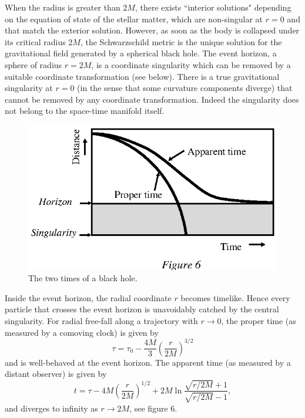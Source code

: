 \documentclass[12pt]{article}
\begin{document}
When the radius is greater than $2M$, there exists ``interior solutions"
depending on the equation of state of the stellar matter, which are
non-singular at $r=0$ and that match the exterior solution.  However,
as soon as the body is collapsed under its critical radius $2M$, the
Schwarzschild metric is the unique solution for the gravitational
field generated by a spherical black hole. The event horizon, a sphere of radius
$r=2M$, is a coordinate singularity which can be removed by a suitable
coordinate transformation (see below). There is a true gravitational
singularity at $r=0$ (in the sense that some curvature components diverge) that
cannot be removed by any coordinate transformation. Indeed the singularity does
not belong to the space-time manifold itself. 
\begin{figure}[tb]
  \begin{center}
    \leavevmode
    \includegraphics{time.ps}
    \caption{The two times of a black hole.}
  \end{center}
\end{figure}
Inside the event horizon, the radial coordinate $r$ becomes timelike. Hence
every particle that crosses the event horizon is unavoidably catched by the
central singularity. For radial free-fall along a trajectory with  $r
\rightarrow 0 $, the proper time (as measured by a comoving clock) is given by 
\begin{equation}
\tau =  \tau_0 - \frac{4M}{3}\left(\frac{r}{2M}\right)^{3/2}
\end{equation}
and is well-behaved at the event horizon.
 The apparent time (as measured by a distant observer) is given by  
\begin{equation}
t = \tau - 4M\left(\frac{r}{2M}\right)^{1/2}
+ 2M \ln\frac{\sqrt{r/2M}+1}{\sqrt{r/2M}-1},
\end{equation}
and diverges to infinity as $r \to 2M$, see figure 6.
\end{document}
